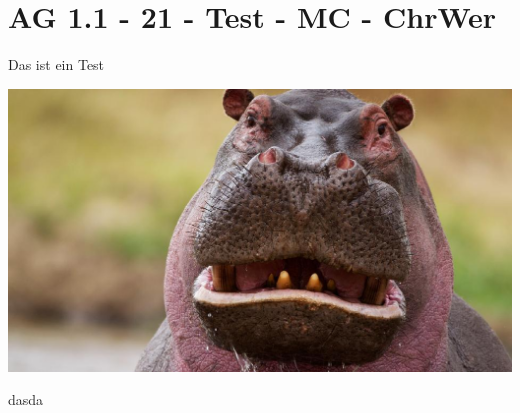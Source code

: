 \section{AG 1.1 - 21 - Test - MC - ChrWer}

\begin{beispiel}[AG 1.1]{1}
Das ist ein Test

\includegraphics{../Beispieleinreichung/Bilder/AG11_21_hippo.eps}

dasda
\end{beispiel}